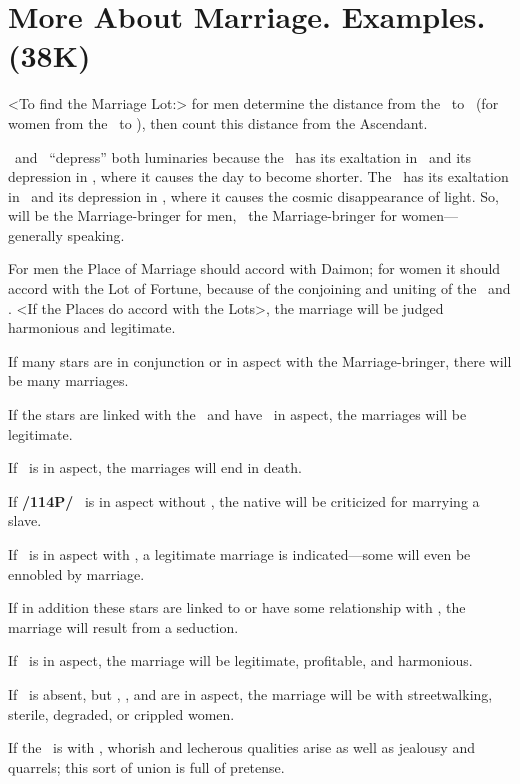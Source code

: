 \section{More About Marriage. Examples. (38K)}

<To find the Marriage Lot:> for men determine the distance from the \Sun\, to \Venus\, (for women from the \Moon\, to \Mars), then count this distance from the Ascendant. 

\Venus\, and \Mars\, “depress” both luminaries because the \Sun\, has its exaltation in \Aries\, and its depression in \Libra, where it causes the day to become shorter. The \Moon\, has its exaltation in \Taurus\, and its depression in \Scorpio, where it causes the cosmic disappearance of light. So, \Venus\, will be the Marriage-bringer for men, \Mars\, the Marriage-bringer for women—generally speaking. 

For men the Place of Marriage should accord with Daimon; for women it should accord with the Lot of Fortune, because of the conjoining and uniting of the \Sun\, and \Moon. <If the Places do accord with the Lots>, the marriage will be judged harmonious and legitimate. 

If many stars are in conjunction or in aspect with the Marriage-bringer, there will be many marriages. 

If the stars are linked with the \Moon\, and have \Jupiter\, in aspect, the marriages will be legitimate. 

If \Saturn\, is in aspect, the marriages will end in death. 

If \textbf{/114P/} \Mercury\, is in aspect without \Jupiter, the native will be criticized for marrying a slave. 

If \Jupiter\, is in aspect with \Saturn, a legitimate marriage is indicated—some will even be ennobled by marriage. 

If in addition these stars are linked to or have some relationship with \Venus, the marriage will result from a seduction. 

If \Jupiter\, is in aspect, the marriage will be legitimate, profitable, and harmonious. 

If \Jupiter\, is absent, but \Saturn, \Mercury, and \Mars are in aspect, the marriage will be with streetwalking, sterile, degraded, or crippled women. 

If the \Moon\, is with \Venus, whorish and lecherous qualities arise as well as jealousy and quarrels; this sort of union is full of pretense. 

